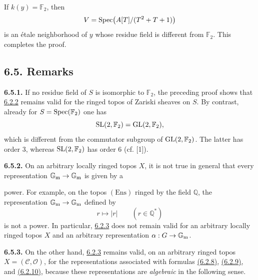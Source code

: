 If $k(y)=\mathbb F_2$, then
\[
V=\operatorname{Spec}\bigl(A[T]/(T^2+T+1)\bigr)
\]
is an \'etale neighborhood of $y$ whose residue field is different from
$\mathbb F_2$. This completes the proof.

\subsection*{6.5. Remarks}
\textbf{6.5.1.}
If no residue field of $S$ is isomorphic to $\mathbb F_2$, the preceding
proof shows that \hyperlink{sga6.e10.prop.6-2-2}{6.2.2} remains valid for the ringed topos of Zariski sheaves
on $S$. By contrast, already for $S=\operatorname{Spec}(\mathbb F_2)$ one has
\[
\operatorname{SL}(2,\mathbb F_2)=\operatorname{GL}(2,\mathbb F_2),
\]
which is different from the commutator subgroup of
$\operatorname{GL}(2,\mathbb F_2)$. The latter has order $3$, whereas
$\operatorname{SL}(2,\mathbb F_2)$ has order $6$ (cf. [1]).

\textbf{6.5.2.}
On an arbitrary locally ringed topos $X$, it is not true in general that
every representation $\mathbb G_{\mathrm m}\to\mathbb G_{\mathrm m}$ is given by a

power. For example, on the topos $(\mathrm{Ens})$ ringed by the field
$\mathbb Q$, the representation $\mathbb G_{\mathrm m}\to\mathbb G_{\mathrm m}$ defined by
\[
r\longmapsto |r|\qquad(r\in\mathbb Q^*)
\]
is not a power. In particular, \hyperlink{sga6.e10.cor.6-2-3}{6.2.3} does not remain valid for an arbitrary
locally ringed topos $X$ and an arbitrary representation
$\alpha:G\to\mathbb G_{\mathrm m}$.

\textbf{6.5.3.}
On the other hand, \hyperlink{sga6.e10.cor.6-2-3}{6.2.3} remains valid, on an arbitrary ringed topos
$X=(\mathcal C,\mathcal O)$, for the representations associated with
formulas \hyperlink{sga6.e10.eq.6-2-8}{(6.2.8)}, \hyperlink{sga6.e10.eq.6-2-9}{(6.2.9)}, and \hyperlink{sga6.e10.eq.6-2-10}{(6.2.10)}, because these representations are
\emph{algebraic} in the following sense.

